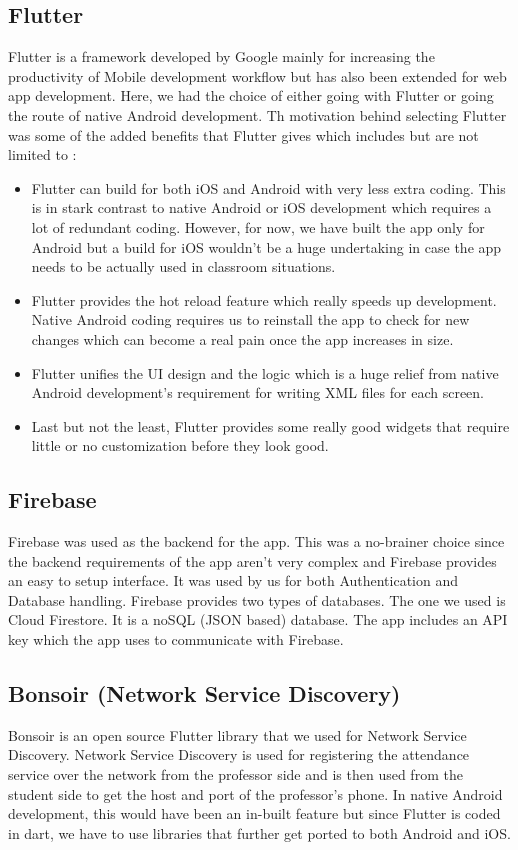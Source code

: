 \documentclass{article}
\begin{document}
\subsection{Flutter}
Flutter is a framework developed by Google mainly for increasing the productivity of Mobile development workflow but has also been extended for web app development. Here, we had the choice of either going with Flutter or going the route of native Android development. Th motivation behind selecting Flutter was some of the added benefits that Flutter gives which includes but are not limited to :
\begin{itemize}
    \item Flutter can build for both iOS and Android with very less extra coding. This is in stark contrast to native Android or iOS development which requires a lot of redundant coding. However, for now, we have built the app only for Android but a build for iOS wouldn't be a huge undertaking in case the app needs to be actually used in classroom situations.
    \item Flutter provides the hot reload feature which really speeds up development. Native Android coding requires us to reinstall the app to check for new changes which can become a real pain once the app increases in size.
    \item Flutter unifies the UI design and the logic which is a huge relief from native Android development's requirement for writing XML files for each screen.
    \item Last but not the least, Flutter provides some really good widgets that require little or no customization before they look good.
\end{itemize}
\subsection{Firebase}
Firebase was used as the backend for the app. This was a no-brainer choice since the backend requirements of the app aren't very complex and Firebase provides an easy to setup interface. It was used by us for both Authentication and Database handling. Firebase provides two types of databases. The one we used is Cloud Firestore. It is a noSQL (JSON based) database. The app includes an API key which the app uses to communicate with Firebase.
\subsection{Bonsoir (Network Service Discovery)}
Bonsoir is an open source Flutter library that we used for Network Service Discovery. Network Service Discovery is used for registering the attendance service over the network from the professor side and is then used from the student side to get the host and port of the professor's phone. In native Android development, this would have been an in-built feature but since Flutter is coded in dart, we have to use libraries that further get ported to both Android and iOS.
\end{document}
